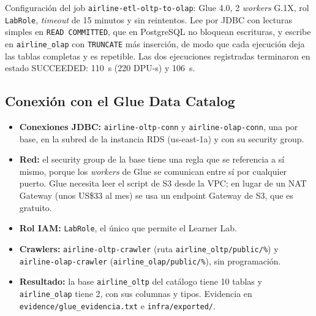 Configuración del job \texttt{airline-etl-oltp-to-olap}: Glue 4.0, 2 \emph{workers} G.1X, rol \texttt{LabRole}, \emph{timeout} de 15 minutos y sin reintentos. Lee por JDBC con lecturas simples en \texttt{READ COMMITTED}, que en PostgreSQL no bloquean escrituras, y escribe en \texttt{airline\_olap} con \texttt{TRUNCATE} más inserción, de modo que cada ejecución deja las tablas completas y es repetible. Las dos ejecuciones registradas terminaron en estado SUCCEEDED: 110~s (220 DPU-s) y 106~s.

\subsection{Conexión con el Glue Data Catalog}
\begin{itemize}
  \item \textbf{Conexiones JDBC:} \texttt{airline-oltp-conn} y \texttt{airline-olap-conn}, una por base, en la subred de la instancia RDS (us-east-1a) y con su security group.
  \item \textbf{Red:} el security group de la base tiene una regla que se referencia a sí mismo, porque los \emph{workers} de Glue se comunican entre sí por cualquier puerto. Glue necesita leer el script de S3 desde la VPC; en lugar de un NAT Gateway (unos US\$33 al mes) se usa un endpoint Gateway de S3, que es gratuito.
  \item \textbf{Rol IAM:} \texttt{LabRole}, el único que permite el Learner Lab.
  \item \textbf{Crawlers:} \texttt{airline-oltp-crawler} (ruta \texttt{airline\_oltp/public/\%}) y \texttt{airline-olap-crawler} (\texttt{airline\_olap/public/\%}), sin programación.
  \item \textbf{Resultado:} la base \texttt{airline\_oltp} del catálogo tiene 10 tablas y \texttt{airline\_olap} tiene 2, con sus columnas y tipos. Evidencia en \texttt{evidence/glue\_evidencia.txt} e \texttt{infra/exported/}.
\end{itemize}

